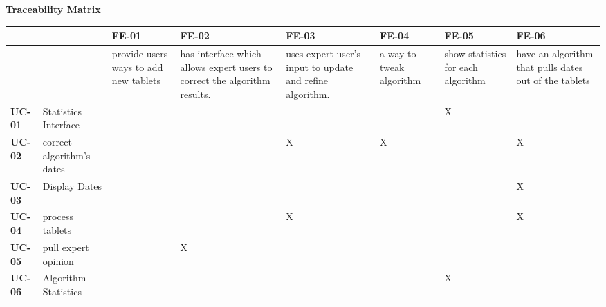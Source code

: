 \documentclass[11pt]{article}
\begin{document}
\begin{landscape}
\begin{center}
\Large \textbf{Traceability Matrix}\\ 
\begin{tabular}{|m{2cm} |m{2.5cm}|m{2.5cm}|m{2.5cm}|m{2.5cm}|m{2.5cm}|m{2.5cm}|m{2.5cm}|}
	\hline
	& & \textbf{FE-01} & \textbf{FE-02} & \textbf{FE-03} & \textbf{FE-04}  & \textbf{FE-05} & \textbf{FE-06} \\ \hline
	&  & provide users ways to add new tablets
 & has interface which allows expert users to correct the algorithm results.
 & uses expert user’s input to update and refine algorithm.
 & a way to tweak algorithm 
  & show statistics for each algorithm
 & have an algorithm that pulls dates out of the tablets
 \\ \hline
	\textbf{UC-01} & Statistics Interface & &  &  &  & X &  \\ \hline
	\textbf{UC-02} & correct algorithm’s dates & &  & X & X &  & X \\ \hline
	\textbf{UC-03} & Display Dates & &  &  &  &  & X \\ \hline
	\textbf{UC-04} & process tablets & &  & X &  &  & X \\ \hline
	\textbf{UC-05} & pull expert opinion & & X &  &  &  &  \\ \hline
	\textbf{UC-06} & Algorithm Statistics & &  &  &  & X &  \\ \hline
\end{tabular}
\end{center}
\end{landscape}
\end{document}
